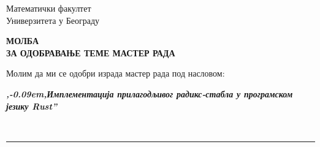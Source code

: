 \documentclass[a4paper]{article}
\def\zn{,\kern-0.09em,}
\begin{document}
\thispagestyle{empty}

\begin{flushleft}
Математички факултет\\
Универзитета у Београду
\end{flushleft}

\bigskip

\begin{center}
\textbf{МОЛБА\\
ЗА ОДОБРАВАЊЕ ТЕМЕ МАСТЕР РАДА
}\end{center}

\bigskip

\begin{flushleft}
Молим да ми се одобри израда мастер рада под насловом:
\end{flushleft}

\begin{minipage}{16.5cm}
\textbf{\textit{\zn Имплементација прилагодљивог радикс-стабла у програмском језику \emph{Rust}''}}
\end{minipage}\\
\rule[4mm]{17.5cm}{.05mm}
\end{document}
